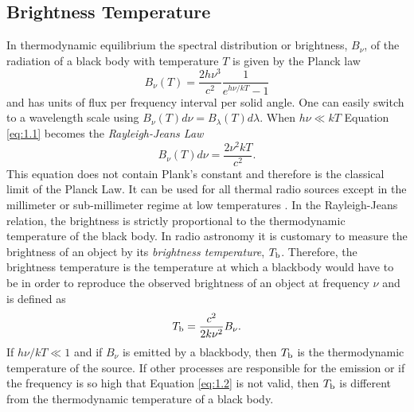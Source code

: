 \subsection{Brightness Temperature}\label{subsec:3.1.1}
In thermodynamic equilibrium the spectral distribution or brightness, $B_{\nu}$, of the radiation of a black body with temperature $T$ is given by the Planck law
\begin{equation}\label{eq:1.1}
B_{\nu}(T)=\frac{2h\nu ^3}{c^2}\frac{1}{e^{h\nu /kT}-1}
\end{equation}
and has units of flux per frequency interval per solid angle. One can easily switch to a wavelength scale using  $B_{\nu}(T)d\nu = B_{\lambda}(T)d\lambda$. When $h\nu \ll kT$ Equation \ref{eq:1.1} becomes the \textit{Rayleigh-Jeans Law}
\begin{equation}
\label{eq:1.2}
B_{\nu}(T)d\nu=\dfrac{2\nu ^2kT}{c^2}.
\end{equation}
This equation does not contain Plank's constant and therefore is the classical limit of the Planck Law. It can be used for all thermal radio sources except in the millimeter or sub-millimeter regime at low temperatures \citep{rohlfs_1996}. In the Rayleigh-Jeans relation, the brightness is strictly proportional to the thermodynamic temperature of the black body. In radio astronomy it is customary to measure the brightness of an object by its \textit{brightness temperature}, $T_{\rm{b}}$. Therefore, the brightness temperature is the temperature at which a blackbody would have to be in order to reproduce the observed brightness of an object at frequency $\nu$ and is defined as
\begin{equation}
T_{\rm{b}}=\frac{c^2}{2k\nu ^2}B_{\nu}. 
\end{equation}
If $h\nu /kT \ll 1$ and if $B_{\nu}$ is emitted by a blackbody, then $T_{\rm{b}}$ is the thermodynamic temperature of the source. If other processes are responsible for the emission or if the frequency is so high that Equation \ref{eq:1.2} is not valid, then $T_{\rm{b}}$ is different from the thermodynamic temperature of a black body.

